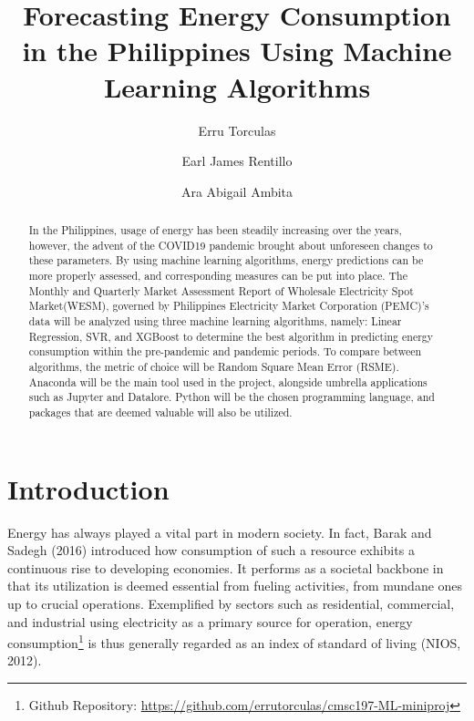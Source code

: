 \documentclass[runningheads]{llncs}
\begin{document}
%
\title{Forecasting Energy Consumption in the Philippines Using Machine Learning Algorithms}
%
%
\author{Erru Torculas \and
Earl James Rentillo \and
Ara Abigail Ambita}
%
%
%
\maketitle              %
%
\begin{abstract}
In the Philippines, usage of energy has been steadily increasing over the years, however, the advent of the COVID19 pandemic brought about unforeseen changes to these parameters. By using machine learning algorithms, energy predictions can be more properly assessed, and corresponding measures can be put into place. The Monthly and Quarterly Market Assessment Report of Wholesale Electricity Spot Market(WESM), governed by Philippines Electricity Market Corporation  (PEMC)'s data will be analyzed using three machine learning algorithms, namely: Linear Regression, SVR, and XGBoost to determine the best algorithm in predicting energy consumption within the pre-pandemic and pandemic periods. To compare between algorithms, the metric of choice will be Random Square Mean Error (RSME). Anaconda will be the main tool used in the project, alongside umbrella applications such as Jupyter and Datalore. Python will be the chosen programming language, and packages that are deemed valuable will also be utilized.

\end{abstract}
%
%
%
\section{Introduction}
Energy has always played a vital part in modern society. In fact, Barak and Sadegh (2016) introduced how consumption of such a resource exhibits a continuous rise to developing economies. It performs as a societal backbone in that its utilization is deemed essential from fueling activities, from mundane ones up to crucial operations. Exemplified by sectors such as residential, commercial, and industrial using electricity as a primary source for operation, energy consumption\footnote{Github Repository: \url{https://github.com/errutorculas/cmsc197-ML-miniproj}} is thus generally regarded as an index of standard of living (NIOS, 2012).
\end{document}
